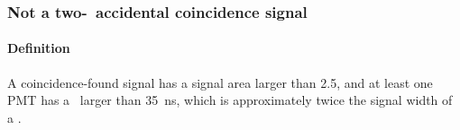 

\subsubsection{Not a two-\sphe\ accidental coincidence signal}
\paragraph{Definition}
A coincidence-found signal has a signal area larger than \SI{2.5}{\phe}, and at least one PMT has a \stw\ larger than \SI{35}{\ns}, which is approximately twice the signal width of a \sphe .  
